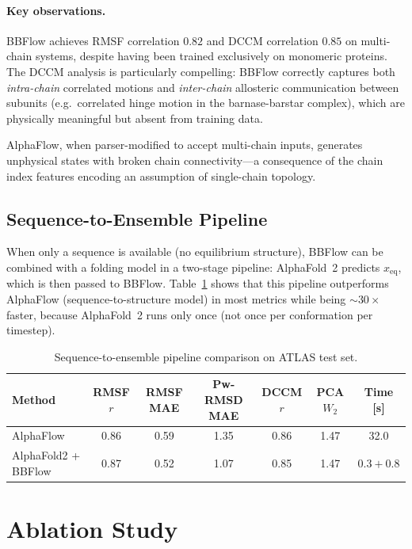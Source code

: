 \documentclass[12pt,a4paper]{article}
\newcommand{\xeq}{x_{\mathrm{eq}}}
\begin{document}
\paragraph{Key observations.}
BBFlow achieves RMSF correlation $0.82$ and DCCM correlation $0.85$ on multi-chain systems,
despite having been trained exclusively on monomeric proteins.  The DCCM analysis is particularly
compelling: BBFlow correctly captures both \emph{intra-chain} correlated motions and
\emph{inter-chain} allosteric communication between subunits (e.g.\ correlated hinge motion
in the barnase-barstar complex), which are physically meaningful but absent from training data.

AlphaFlow, when parser-modified to accept multi-chain inputs, generates unphysical states
with broken chain connectivity---a consequence of the chain index features encoding an
assumption of single-chain topology.

\subsection{Sequence-to-Ensemble Pipeline}
\label{sec:seq_to_ensemble}

When only a sequence is available (no equilibrium structure), BBFlow can be combined with
a folding model in a two-stage pipeline: AlphaFold~2 predicts $\xeq$, which is then passed
to BBFlow.  Table~\ref{tab:seq2ens} shows that this pipeline outperforms AlphaFlow
(sequence-to-structure model) in most metrics while being $\sim\!30\times$ faster, because
AlphaFold~2 runs only once (not once per conformation per timestep).

\begin{table}[h]
  \centering
  \caption{Sequence-to-ensemble pipeline comparison on ATLAS test set.}
  \label{tab:seq2ens}
  \small
  \begin{tabular}{lcccccc}
    \toprule
    \textbf{Method} & RMSF $r$ & RMSF MAE & Pw-RMSD MAE & DCCM $r$ & PCA $W_2$ & Time [s] \\
    \midrule
    AlphaFlow           & 0.86 & 0.59 & 1.35 & 0.86 & 1.47 & 32.0 \\
    AlphaFold2 + BBFlow & 0.87 & 0.52 & 1.07 & 0.85 & 1.47 & $0.3 + 0.8$ \\
    \bottomrule
  \end{tabular}
\end{table}

\section{Ablation Study}
\label{sec:ablation}
\end{document}
